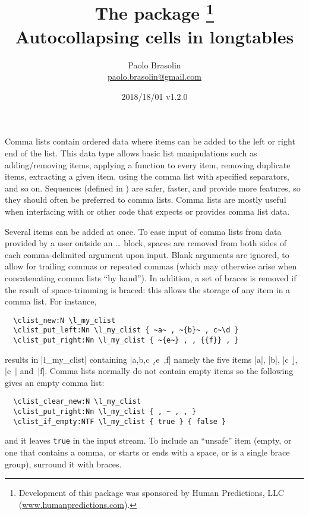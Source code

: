 \documentclass[full,kernel]{l3doc}
\begin{document}
\title{%
  The  package%
  \thanks{Development of this package was sponsored by Human Predictions,
    LLC (\href{http://www.humanpredictions.com}{www.humanpredictions.com}).}\\
  Autocollapsing cells in longtables
}

\author{
  Paolo Brasolin\\
  \href{mailto:paolo.brasolin@gmail.com}{paolo.brasolin@gmail.com}
}

\date{2018/18/01 v1.2.0}

\maketitle

\begin{documentation}

Comma lists contain ordered data where items can be added to the left
or right end of the list.  This data type allows basic list
manipulations such as adding/removing items, applying a function to
every item, removing duplicate items, extracting a given item, using
the comma list with specified separators, and so on.  Sequences
(defined in ) are safer, faster, and provide more features,
so they should often be preferred to comma lists.  Comma lists are
mostly useful when interfacing with \LaTeXe{} or other code that
expects or provides comma list data.

Several items can be added at once.  To ease input of comma lists from
data provided by a user outside an  \ldots{}
 block, spaces are removed from both sides of each
comma-delimited argument upon input.  Blank arguments are ignored, to
allow for trailing commas or repeated commas (which may otherwise
arise when concatenating comma lists \enquote{by hand}).  In addition,
a set of braces is removed if the result of space-trimming is braced:
this allows the storage of any item in a comma list.  For instance,
\begin{verbatim}
  \clist_new:N \l_my_clist
  \clist_put_left:Nn \l_my_clist { ~a~ , ~{b}~ , c~\d }
  \clist_put_right:Nn \l_my_clist { ~{e~} , , {{f}} , }
\end{verbatim}
results in |\l_my_clist| containing |a,b,c~\d,{e~},{{f}}| namely the
five items |a|, |b|, |c~\d|, |e~| and~|{f}|.  Comma lists normally do
not contain empty items so the following gives an empty comma list:
\begin{verbatim}
  \clist_clear_new:N \l_my_clist
  \clist_put_right:Nn \l_my_clist { , ~ , , }
  \clist_if_empty:NTF \l_my_clist { true } { false }
\end{verbatim}
and it leaves \texttt{true} in the input stream.  To include an
\enquote{unsafe} item (empty, or one that contains a comma, or starts
or ends with a space, or is a single brace group), surround it with
braces.


\end{documentation}
\end{document}
